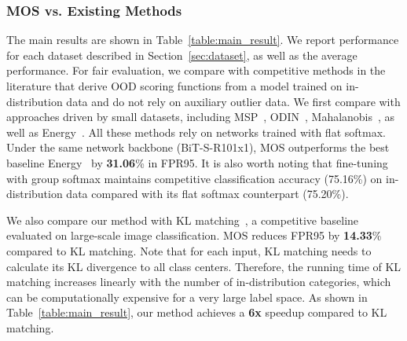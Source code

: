 \documentclass[final]{cvpr}
\begin{document}
\subsubsection{MOS vs. Existing Methods}
\label{sec:exp_main_results}
\vspace{-0.2cm}
The main results are shown in Table~\ref{table:main_result}. We report performance for each dataset described in Section~\ref{sec:dataset}, as well as the average performance. For fair evaluation, we compare with competitive methods in the literature that derive OOD scoring functions from a model trained on in-distribution data and do not rely on auxiliary outlier data. We first compare with approaches driven by small datasets, including MSP~\cite{hendrycks2016baseline}, ODIN~\cite{liang2018enhancing}, Mahalanobis~\cite{lee2018simple}, as well as Energy~\cite{liu2020energy}. All these methods rely on networks trained with flat softmax. Under the same network backbone (BiT-S-R101x1), MOS outperforms the best baseline Energy~\cite{liu2020energy} by \textbf{31.06}\% in FPR95. It is also worth noting that fine-tuning with group softmax maintains competitive classification accuracy (75.16\%) on in-distribution data compared with its flat softmax counterpart (75.20\%).

We also compare our method with KL matching~\cite{hendrycks2019benchmark}, a competitive baseline evaluated on large-scale image classification. MOS reduces FPR95 by \textbf{14.33}\% compared to KL matching. Note that for each input, KL matching needs to calculate its KL divergence to all class centers.
Therefore, the running time of KL matching increases linearly with the number of in-distribution categories, which can be computationally expensive for a very large label space. As shown in Table~\ref{table:main_result}, our method achieves a \textbf{6x} speedup compared to KL matching.


















\vspace{-0.3cm}
\end{document}
